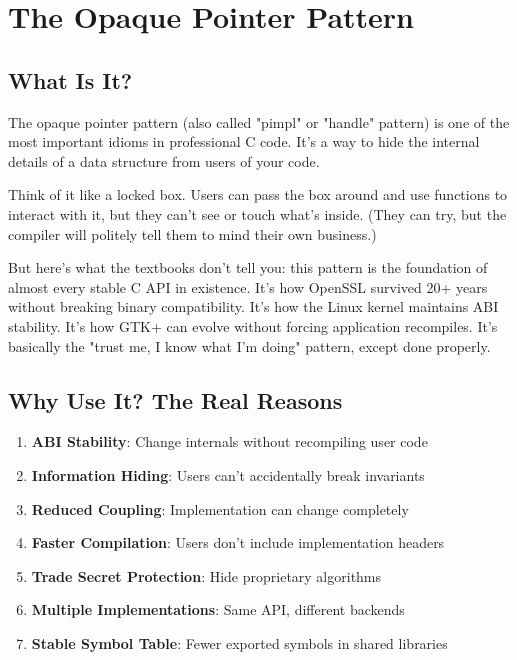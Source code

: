 \chapter{The Opaque Pointer Pattern}

\section{What Is It?}

The opaque pointer pattern (also called "pimpl" or "handle" pattern) is one of the most important idioms in professional C code. It's a way to hide the internal details of a data structure from users of your code.

Think of it like a locked box. Users can pass the box around and use functions to interact with it, but they can't see or touch what's inside. (They can try, but the compiler will politely tell them to mind their own business.)

But here's what the textbooks don't tell you: this pattern is the foundation of almost every stable C API in existence. It's how OpenSSL survived 20+ years without breaking binary compatibility. It's how the Linux kernel maintains ABI stability. It's how GTK+ can evolve without forcing application recompiles. It's basically the "trust me, I know what I'm doing" pattern, except done properly.

\section{Why Use It? The Real Reasons}

\begin{enumerate}
    \item \textbf{ABI Stability}: Change internals without recompiling user code
    \item \textbf{Information Hiding}: Users can't accidentally break invariants
    \item \textbf{Reduced Coupling}: Implementation can change completely
    \item \textbf{Faster Compilation}: Users don't include implementation headers
    \item \textbf{Trade Secret Protection}: Hide proprietary algorithms
    \item \textbf{Multiple Implementations}: Same API, different backends
    \item \textbf{Stable Symbol Table}: Fewer exported symbols in shared libraries
\end{enumerate}


